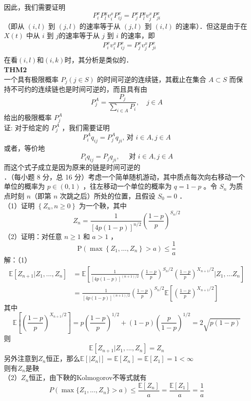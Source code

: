 \documentclass[UTF8]{ctexart}
\begin{document}
因此，我们需要证明
$$
P_i^x P_l^y v_i^x P_{i j}^x=P_j^x P_l^y v_j^x P_{j i}^x
$$
（即从 $(i, l)$ 到 $(j, l)$ 的速率等于从 $(j, l)$ 到 $(i, l)$ 的速率）．但这是由于在 $X(t)$ 中从 $i$ 到 $j$的速率等于从 $j$ 到 $i$ 的速率，即\\
$$
\begin{aligned}
	&P_i^x v_i^x P_{i j}^x=P_j^x v_j^x P_{j i}^x\\
\end{aligned}
$$
在看$(i, l)$和$(i, k)$时，其分析是类似的．\\
\textbf{THM2}\\
一个具有极限概率 $P_j(j \in S)$ 的时间可逆的连续链，其截止在集合 $A \subset S$ 而保持不可约的连续链也是时间可逆的，而且具有由\\
$$
P_j^A=\frac{P_j}{\sum_{i \in A} P_i}, \quad j \in A
$$
给出的极限概率 $P_j^A$ \\
证: 对于给定的 $P_j^A$ ，我们需要证明
$$
P_i^A q_{i j}=P_j^A q_{j i} \text {, 对 } i \in A, j \in A
$$
或者，等价地
$$
P_i q_{i j}=P_j q_{j i}, \quad \text { 对 } i \in A, j \in A
$$
而这个式子成立是因为原来的链是时间可逆的\\


．（每小题 8 分，总 16 分）考虑一个简单随机游动，其中质点每次向右移动一个单位的概率为 $p \in(0,1)$ ，往左移动一个单位的概率为 $q=1-p$ 。令 $S_{n}$ 为质点时刻 $n$（即第 $n$ 次跳之后）所处的位置，且假设 $S_{0}=0$ ．\\
（1）证明 $\left\{Z_{n}, n \geq 0\right\}$ 为一个鞅，其中
$$
Z_{n}=\frac{1}{[4 p(1-p)]^{n / 2}}\left(\frac{1-p}{p}\right)^{S_{n} / 2}
$$
（2）证明：对任意 $n \geq 1$ 和 $a>1$ ，
$$
\mathrm{P}\left(\max \left\{Z_{1}, \ldots, Z_{n}\right\}>a\right) \leq \frac{1}{a}
$$
解：（1）\\
$$
\begin{aligned}
	\mathbb{E}[Z_{n+1}|Z_1,...,Z_n] &= \mathbb{E}\left[\frac{1}{[4 p(1-p)]^{(n+1) / 2}}\left(\frac{1-p}{p}\right)^{S_{n} / 2}\left(\frac{1-p}{p}\right)^{X_{n+1} / 2}|Z_1,...Z_n\right] \\
 & =\frac{1}{[4 p(1-p)]^{(n+1) / 2}}\left(\frac{1-p}{p}\right)^{S_{n} / 2}\mathbb{E}\left[\left(\frac{1-p}{p}\right)^{X_{n+1} / 2}\right ]
\end{aligned}
$$
其中
\[
\mathbb{E}\left[\left(\frac{1-p}{p}\right)^{X_{n+1} / 2}\right ]=p\left(\frac{1-p}{p}\right)^{1 / 2}+(1-p)\left(\frac{p}{1-p}\right)^{1 / 2}=2\sqrt{p(1-p)}
\]
则
\[
\mathbb{E}[Z_{n+1}|Z_1,...,Z_n]=Z_n
\]
另外注意到$Z_n$恒正，那么$\mathbb{E}[|Z_n|]=\mathbb{E}[Z_n]=\mathbb{E}[Z_1]=1<\infty$\\
则有$Z_n$是鞅\\
（2）$Z_n$恒正，由下鞅的Kolmogorov不等式就有\\
\[
P(\max\{Z_1,...,Z_n\}>a) \le \frac{\mathbb{E}[Z_n]}{a}=\frac{\mathbb{E}[Z_1]}{a}=\frac{1}{a}
\]\\
\end{document}
